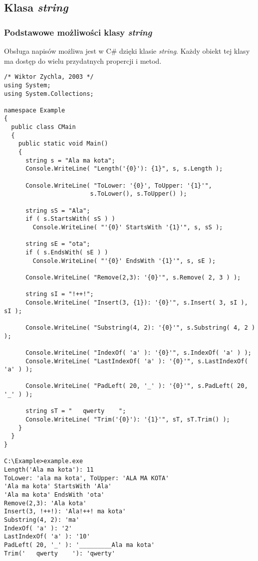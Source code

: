 ﻿\subsection{Klasa {\em string}}

\subsubsection{Podstawowe możliwości klasy {\em string}}

Obsługa napisów możliwa jest w C\# dzięki klasie {\em string}. Każdy obiekt tej klasy ma dostęp do
wielu przydatnych propercji i metod. 

\begin{scriptsize}
\begin{verbatim}
/* Wiktor Zychla, 2003 */
using System;
using System.Collections;

namespace Example
{ 
  public class CMain
  {    
    public static void Main()
    {
      string s = "Ala ma kota";
      Console.WriteLine( "Length('{0}'): {1}", s, s.Length );
    	
      Console.WriteLine( "ToLower: '{0}', ToUpper: '{1}'", 
                        s.ToLower(), s.ToUpper() );
    	
      string sS = "Ala";
      if ( s.StartsWith( sS ) )
        Console.WriteLine( "'{0}' StartsWith '{1}'", s, sS );
    	
      string sE = "ota";
      if ( s.EndsWith( sE ) )
        Console.WriteLine( "'{0}' EndsWith '{1}'", s, sE );
    	
      Console.WriteLine( "Remove(2,3): '{0}'", s.Remove( 2, 3 ) );
    	
      string sI = "!++!";
      Console.WriteLine( "Insert(3, {1}): '{0}'", s.Insert( 3, sI ), sI );
    	
      Console.WriteLine( "Substring(4, 2): '{0}'", s.Substring( 4, 2 ) );
    	
      Console.WriteLine( "IndexOf( 'a' ): '{0}'", s.IndexOf( 'a' ) );
      Console.WriteLine( "LastIndexOf( 'a' ): '{0}'", s.LastIndexOf( 'a' ) );    	      
    	
      Console.WriteLine( "PadLeft( 20, '_' ): '{0}'", s.PadLeft( 20, '_' ) );
    	
      string sT = "   qwerty    ";
      Console.WriteLine( "Trim('{0}'): '{1}'", sT, sT.Trim() );
    }
  }
}

C:\Example>example.exe
Length('Ala ma kota'): 11
ToLower: 'ala ma kota', ToUpper: 'ALA MA KOTA'
'Ala ma kota' StartsWith 'Ala'
'Ala ma kota' EndsWith 'ota'
Remove(2,3): 'Ala kota'
Insert(3, !++!): 'Ala!++! ma kota'
Substring(4, 2): 'ma'
IndexOf( 'a' ): '2'
LastIndexOf( 'a' ): '10'
PadLeft( 20, '_' ): '_________Ala ma kota'
Trim('   qwerty    '): 'qwerty'
\end{verbatim}
\end{scriptsize}

